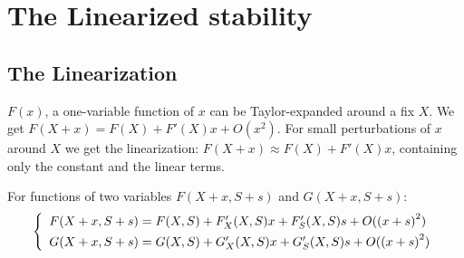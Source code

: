 \documentclass[a4paper, 10pt, twoside, openright]{book}
\begin{document}

\appendix

\chapter{The Linearized stability}

\section{The Linearization}

$F(x)$, a one-variable function of $x$ can be Taylor-expanded
around a fix $X$. We get $F(X+x)=F(X) + F'(X) x + O({x}^{2})$.
For small perturbations of $x$ around $X$ we get the linearization:
$F(X+x) \approx F(X) + F'(X) x$, containing only the
constant and the linear terms.

For functions of two variables $F(X+x,S+s)$ and $G(X+x,S+s)$:
\begin{displaymath} 
\left\{ \begin{array}{l}
F(X+x,S+s)= F(X,S) + {F}_{X}'(X,S)x + {F}_{S}'(X,S)s + O({(x+s)}^{2})\\
G(X+x,S+s)= G(X,S) + {G}_{X}'(X,S)x + {G}_{S}'(X,S)s + O({(x+s)}^{2})
\rule{0pt}{3ex} 
\end{array}\right. 
\end{displaymath}
\end{document}

